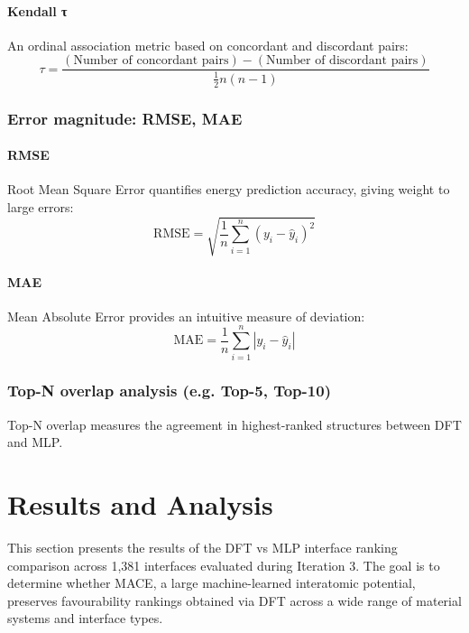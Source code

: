 \paragraph{Kendall τ}

An ordinal association metric based on concordant and discordant pairs:
\[
\tau = \frac{(\text{Number of concordant pairs}) - (\text{Number of discordant pairs})}{\frac{1}{2}n(n-1)}
\]

\subsubsection{Error magnitude: RMSE, MAE}

\paragraph{RMSE}

Root Mean Square Error quantifies energy prediction accuracy, giving weight to large errors:
\[
\text{RMSE} = \sqrt{\frac{1}{n} \sum_{i=1}^{n} (y_i - \hat{y}_i)^2}
\]

\paragraph{MAE}

Mean Absolute Error provides an intuitive measure of deviation:
\[
\text{MAE} = \frac{1}{n} \sum_{i=1}^{n} |y_i - \hat{y}_i|
\]

\subsubsection{Top-N overlap analysis (e.g. Top-5, Top-10)}

Top-N overlap measures the agreement in highest-ranked structures between DFT and MLP.


\section{Results and Analysis}
\label{section:results_and_analysis}

This section presents the results of the DFT vs MLP interface ranking comparison across 1,381 interfaces evaluated
during Iteration 3. The goal is to determine whether MACE, a large machine-learned interatomic potential, preserves
favourability rankings obtained via DFT across a wide range of material systems and interface types.

